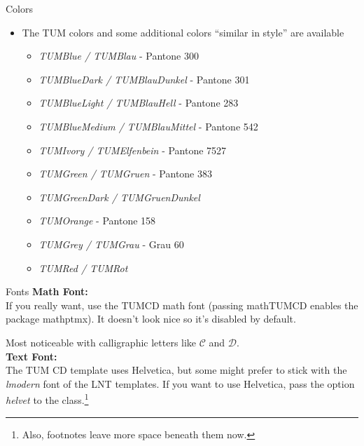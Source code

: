 \documentclass[english,169,helvet]{ICEbeamerTUMCD}
\begin{document}
\begin{frame}{Colors}
  \begin{itemize}
  \item The TUM colors and some additional colors ``similar in style'' are available
    \begin{itemize}
    \item \color{TUMBlau} \emph{TUMBlue / TUMBlau} - Pantone 300
\item \color{TUMBlauDunkel} \emph{TUMBlueDark / TUMBlauDunkel} - Pantone 301
\item \color{TUMBlauHell} \emph{TUMBlueLight / TUMBlauHell} - Pantone 283
\item \color{TUMBlauMittel} \emph{TUMBlueMedium / TUMBlauMittel} - Pantone 542
\item \color{TUMElfenbein} \emph{TUMIvory / TUMElfenbein} - Pantone 7527
\item \color{TUMGruen} \emph{TUMGreen / TUMGruen} - Pantone 383
\item \color{TUMGruenDunkel}\emph{TUMGreenDark / TUMGruenDunkel}
\item \color{TUMOrange}{RGB} \emph{TUMOrange} - Pantone 158
\item \color{TUMGrau} \emph{TUMGrey / TUMGrau} - Grau 60
\item \color{TUMRot} \emph{TUMRed / TUMRot}
    \end{itemize}
  \end{itemize}
\end{frame}

\begin{frame}{Fonts}
  \textbf{Math Font:}\\
  If you really want, use the TUMCD math font (passing mathTUMCD enables the package mathptmx). It doesn't look nice so it's disabled by default.

  Most noticeable with calligraphic letters like $\mathcal{C}$ and $\mathcal{D}$.\\[1em]

  \textbf{Text Font:}\\
  The TUM CD template uses Helvetica, but some might prefer to stick with the \emph{lmodern} font of the LNT templates. If you want to use Helvetica, pass the option \emph{helvet} to the class.\footnote{Also, footnotes leave more space beneath them now.}
  
\end{frame}

\end{document}
